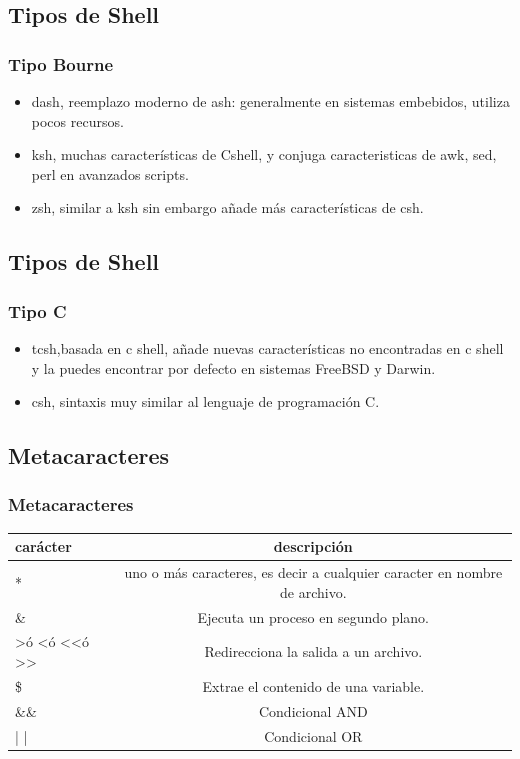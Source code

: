 \documentclass{beamer}
\begin{document}
\subsection{Tipos de Shell}
\begin{frame}
\frametitle{Tipo Bourne}
	\begin{itemize}
		\item dash, reemplazo moderno de ash: generalmente en sistemas embebidos, utiliza pocos recursos.
		\item ksh, muchas caracter\'isticas de Cshell, y conjuga caracteristicas de awk, sed, perl en avanzados scripts.
		\item zsh, similar a ksh sin embargo a\~nade más caracter\'isticas de csh. 
	\end{itemize}
\end{frame}

\subsection{Tipos de Shell}
\begin{frame}
\frametitle{Tipo C}
	\begin{itemize}
		\item tcsh,basada en c shell, añade nuevas caracter\'isticas no encontradas en c shell y la puedes encontrar por defecto en sistemas FreeBSD y Darwin.
		\item csh, sintaxis muy similar al lenguaje de programaci\'on C.
	\end{itemize}
\end{frame}

\subsection{Metacaracteres}
\begin{frame}
\frametitle{ Metacaracteres }
	\begin{center}
	\begin{tabular*}{\textwidth}{ @{\extracolsep{\fill}}  | l | c |  }
		\hline
		car\'acter & descripci\'on  \\	
		\hline
		* & {\tiny  uno o m\'as caracteres, es decir a cualquier caracter en nombre de archivo. } \\	
		\hline
		\& & {\tiny Ejecuta un proceso en segundo plano.} \\	
		\hline
		\textgreater \'o \textless \'o \textless \textless \'o \textgreater \textgreater & {\tiny Redirecciona la salida a un archivo.} \\	
		\hline
		\$ & {\tiny Extrae el contenido de una variable.} \\	
		\hline
		\&\&  & {\tiny Condicional AND } \\	
		\hline
		| |  & {\tiny  Condicional OR} \\	
		\hline
	\end{tabular*}
	\end{center}
\end{frame}
\end{document}
